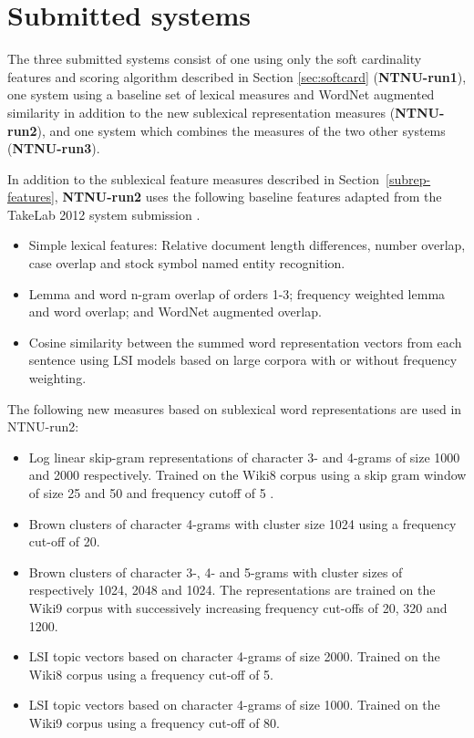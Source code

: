 
\section{Submitted systems}
\label{sec:systems}

The three submitted systems consist of one using only the soft cardinality features and scoring algorithm 
described in Section \ref{sec:softcard} ({\bf NTNU-run1}), 
one system using a baseline set of lexical measures and WordNet augmented similarity 
in addition to the new sublexical representation measures ({\bf NTNU-run2}), 
and one system which combines the measures of the two other systems ({\bf NTNU-run3}).

In addition to the sublexical feature measures described in Section~\ref{subrep-features},
{\bf NTNU-run2} uses the following baseline features adapted from the TakeLab 2012 system 
submission \cite{saric2012takelab}.

\begin{itemize}
\item Simple lexical features: Relative document length differences, number overlap, case overlap and stock symbol named entity recognition.
\item Lemma and word n-gram overlap of orders 1-3;
frequency weighted lemma and word overlap; and
WordNet augmented overlap.
\item Cosine similarity between the summed word representation vectors from each sentence using LSI models based on large corpora with or without frequency weighting.
\end{itemize}

The following new measures based on sublexical word representations are used in NTNU-run2:

\begin{itemize}
\item Log linear skip-gram representations of character 3- and 4-grams of size 1000 and 2000 respectively. Trained on the Wiki8 corpus using a skip gram window of size 25 and 50 and frequency cutoff of 5 .
\item Brown clusters of character 4-grams with cluster size 1024 using a frequency cut-off of 20.
\item Brown clusters of character 3-, 4- and 5-grams with cluster sizes of respectively 1024, 2048 and 1024.
The representations are trained on the Wiki9 corpus with successively increasing frequency cut-offs of 20, 320 and 1200.
\item LSI topic vectors based on character 4-grams of size 2000.   Trained on the Wiki8 corpus using a frequency cut-off of 5.
\item LSI topic vectors based on character 4-grams of size 1000. Trained on the Wiki9 corpus using a frequency cut-off of 80.
\end{itemize}

